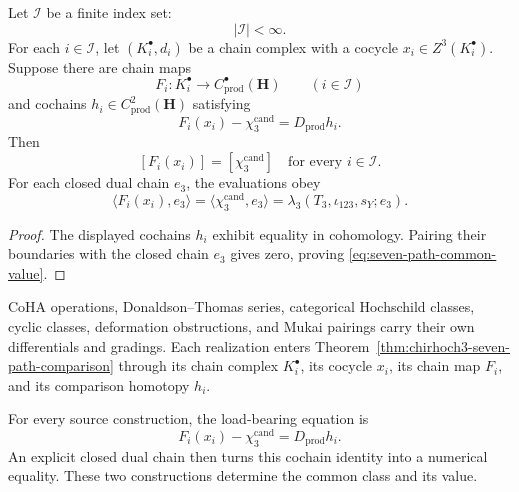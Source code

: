 \begin{theorem}
\label{thm:chirhoch3-seven-path-comparison}
\ClaimStatusProvedHere
Let \(\mathcal I\) be a finite index set:
\begin{equation}
\label{eq:seven-path-list}
 |\mathcal I|<\infty.
\end{equation}
For each \(i\in\mathcal I\), let \((K_i^\bullet,d_i)\) be a chain
complex with a cocycle
\(x_i\in Z^3(K_i^\bullet)\).  Suppose there are chain maps
\begin{equation}
\label{eq:seven-comparison-maps}
 F_i:K_i^\bullet\longrightarrow
 C^\bullet_{\mathrm{prod}}(\mathbf H)
 \qquad (i\in\mathcal I)
\end{equation}
and cochains \(h_i\in C^2_{\mathrm{prod}}(\mathbf H)\) satisfying
\[
 F_i(x_i)-\chi_3^{\mathrm{cand}}
 =D_{\mathrm{prod}}h_i.
\]
Then
\[
 [F_i(x_i)]=[\chi_3^{\mathrm{cand}}]
 \quad\text{for every }i\in\mathcal I.
\]
For each closed dual chain \(e_3\), the evaluations obey
\begin{equation}
\label{eq:seven-path-common-value}
 \langle F_i(x_i),e_3\rangle
 =\langle\chi_3^{\mathrm{cand}},e_3\rangle
 =\lambda_3(T_3,\iota_{123},s_Y;e_3).
\end{equation}
\end{theorem}

\begin{proof}
The displayed cochains \(h_i\) exhibit equality in cohomology.  Pairing
their boundaries with the closed chain \(e_3\) gives zero, proving
\eqref{eq:seven-path-common-value}.
\end{proof}

\begin{remark}
\label{rem:chirhoch3-path-G-independence-comparison}
CoHA operations, Donaldson--Thomas series, categorical Hochschild
classes, cyclic classes, deformation obstructions, and Mukai pairings
carry their own differentials and gradings.  Each realization enters
Theorem~\ref{thm:chirhoch3-seven-path-comparison} through its chain
complex \(K_i^\bullet\), its cocycle \(x_i\), its chain map \(F_i\), and
its comparison homotopy \(h_i\).
\end{remark}

\begin{remark}
\label{rem:chirhoch3-seven-voice-cadence}
For every source construction, the load-bearing equation is
\[
 F_i(x_i)-\chi_3^{\mathrm{cand}}=D_{\mathrm{prod}}h_i.
\]
An explicit closed dual chain then turns this cochain identity into a
numerical equality.  These two constructions determine the common class
and its value.
\end{remark}

